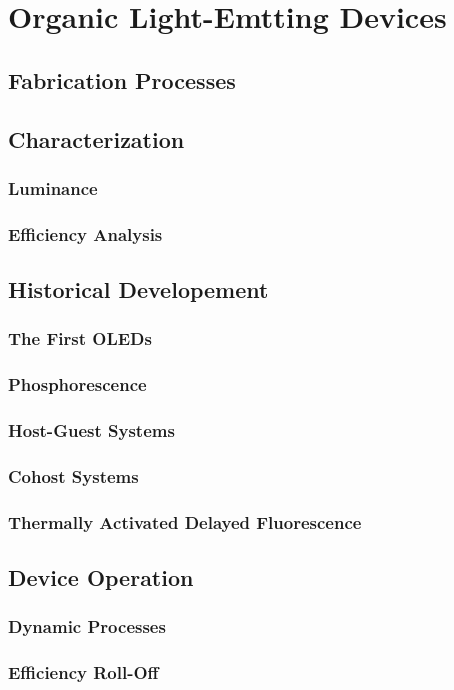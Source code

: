 \documentclass[../thesis.tex]{subfiles}
\begin{document}
\section{Organic Light-Emtting Devices}

\subsection{Fabrication Processes}

\subsection{Characterization}
\subsubsection{Luminance}
\subsubsection{Efficiency Analysis}

\subsection{Historical Developement}
\subsubsection{The First OLEDs}
\subsubsection{Phosphorescence}
\subsubsection{Host-Guest Systems}
\subsubsection{Cohost Systems}
\subsubsection{Thermally Activated Delayed Fluorescence}

\subsection{Device Operation}
\subsubsection{Dynamic Processes}
\subsubsection{Efficiency Roll-Off}




\end{document}
